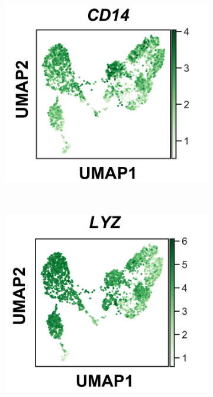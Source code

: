 \bigskip
\begin{figure}[H]
\centering
\begin{subfigure}[b]{0.40\textwidth}
\centering 
\includegraphics[width=\textwidth]{./Results3/pdfs/PSA_monocytes_scanpy_single_cell_CD14_UMAP}
\caption{}
\end{subfigure}
~
\begin{subfigure}[b]{0.40\textwidth} 
\centering
\includegraphics[width=\textwidth]{./Results3/pdfs/PSA_monocytes_scanpy_single_cell_LYZ_UMAP}

\end{subfigure}
\end{figure}
